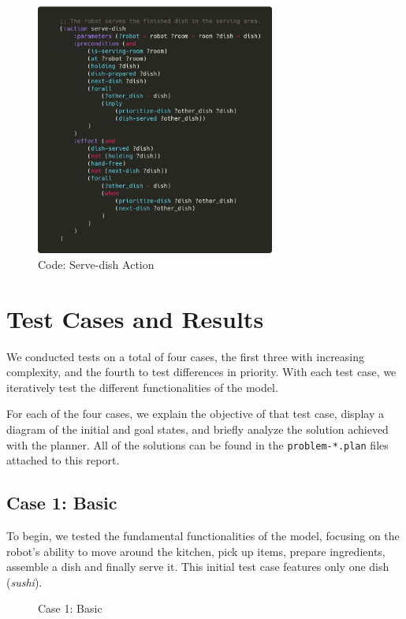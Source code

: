 \documentclass{article}
\begin{document}
    \begin{figure}[ht]
    \centering
    \includegraphics[width=0.70\textwidth]{assets/serve-dish.png}
    \caption{Code: Serve-dish Action}
    \label{fig:act:serve-dish}
\end{figure}

\newpage
\section{Test Cases and Results}

We conducted tests on a total of four cases, the first three with increasing complexity, and the fourth to test differences in priority. With each test case, we iteratively test the different functionalities of the model.

For each of the four cases, we explain the objective of that test case, display a diagram of the initial and goal states, and briefly analyze the solution achieved with the planner. All of the solutions can be found in the \texttt{problem-*.plan} files attached to this report.

\subsection{Case 1: Basic}

To begin, we tested the fundamental functionalities of the model, focusing on the robot's ability to move around the kitchen, pick up items, prepare ingredients, assemble a dish and finally serve it. This initial test case features only one dish (\textit{sushi}).

\begin{figure}[ht]
    \centering
    \caption{Case 1: Basic}
    \label{fig:initial-state}
\end{figure}
\FloatBarrier
\end{document}
